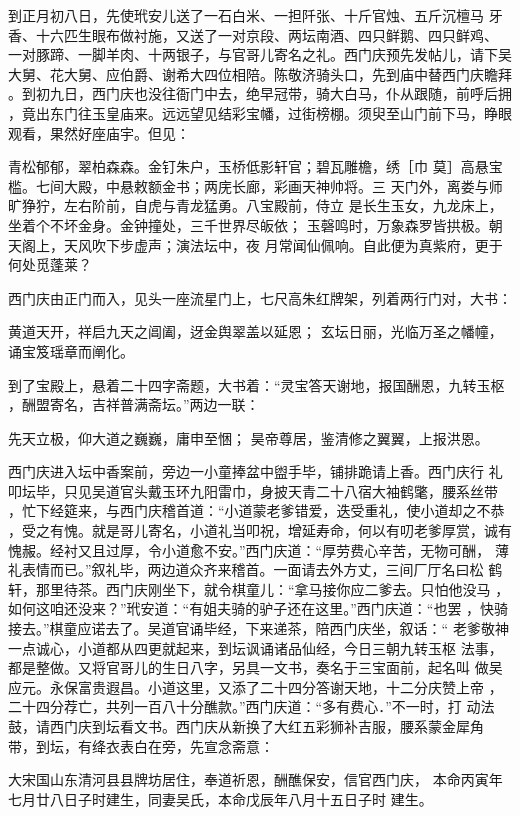 到正月初八日，先使玳安儿送了一石白米、一担阡张、十斤官烛、五斤沉檀马
牙香、十六匹生眼布做衬施，又送了一对京段、两坛南酒、四只鲜鹅、四只鲜鸡、
一对豚蹄、一脚羊肉、十两银子，与官哥儿寄名之礼。西门庆预先发帖儿，请下吴
大舅、花大舅、应伯爵、谢希大四位相陪。陈敬济骑头口，先到庙中替西门庆瞻拜
。到初九日，西门庆也没往衙门中去，绝早冠带，骑大白马，仆从跟随，前呼后拥
，竟出东门往玉皇庙来。远远望见结彩宝幡，过街榜棚。须臾至山门前下马，睁眼
观看，果然好座庙宇。但见：

青松郁郁，翠柏森森。金钉朱户，玉桥低影轩官；碧瓦雕檐，绣［巾
莫］高悬宝槛。七间大殿，中悬敕额金书；两庑长廊，彩画天神帅将。三
天门外，离娄与师旷狰狞，左右阶前，自虎与青龙猛勇。八宝殿前，侍立
是长生玉女，九龙床上，坐着个不坏金身。金钟撞处，三千世界尽皈依；
玉磬鸣时，万象森罗皆拱极。朝天阁上，天风吹下步虚声；演法坛中，夜
月常闻仙佩响。自此便为真紫府，更于何处觅蓬莱？

西门庆由正门而入，见头一座流星门上，七尺高朱红牌架，列着两行门对，大书：

黄道天开，祥启九天之阊阖，迓金舆翠盖以延恩；
玄坛日丽，光临万圣之幡幢，诵宝笈瑶章而阐化。

到了宝殿上，悬着二十四字斋题，大书着：“灵宝答天谢地，报国酬恩，九转玉枢
，酬盟寄名，吉祥普满斋坛。”两边一联：

先天立极，仰大道之巍巍，庸申至悃；
昊帝尊居，鉴清修之翼翼，上报洪恩。

西门庆进入坛中香案前，旁边一小童捧盆中盥手毕，铺排跪请上香。西门庆行
礼叩坛毕，只见吴道官头戴玉环九阳雷巾，身披天青二十八宿大袖鹤氅，腰系丝带
，忙下经筵来，与西门庆稽首道：“小道蒙老爹错爱，迭受重礼，使小道却之不恭
，受之有愧。就是哥儿寄名，小道礼当叩祝，增延寿命，何以有叨老爹厚赏，诚有
愧赧。经衬又且过厚，令小道愈不安。”西门庆道：“厚劳费心辛苦，无物可酬，
薄礼表情而已。”叙礼毕，两边道众齐来稽首。一面请去外方丈，三间厂厅名曰松
鹤轩，那里待茶。西门庆刚坐下，就令棋童儿：“拿马接你应二爹去。只怕他没马
，如何这咱还没来？”玳安道：“有姐夫骑的驴子还在这里。”西门庆道：“也罢
，快骑接去。”棋童应诺去了。吴道官诵毕经，下来递茶，陪西门庆坐，叙话：“
老爹敬神一点诚心，小道都从四更就起来，到坛讽诵诸品仙经，今日三朝九转玉枢
法事，都是整做。又将官哥儿的生日八字，另具一文书，奏名于三宝面前，起名叫
做吴应元。永保富贵遐昌。小道这里，又添了二十四分答谢天地，十二分庆赞上帝
，二十四分荐亡，共列一百八十分醮款。”西门庆道：“多有费心．”不一时，打
动法鼓，请西门庆到坛看文书。西门庆从新换了大红五彩狮补吉服，腰系蒙金犀角
带，到坛，有绛衣表白在旁，先宣念斋意：

大宋国山东清河县县牌坊居住，奉道祈恩，酬醮保安，信官西门庆，
本命丙寅年七月廿八日子时建生，同妻吴氏，本命戊辰年八月十五日子时
建生。


